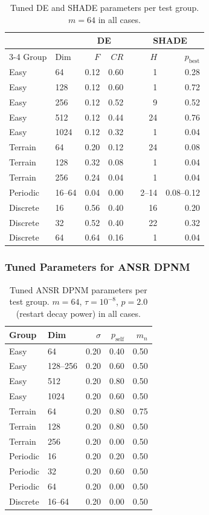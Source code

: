 \documentclass[11pt,a4paper]{article}
\begin{document}
\begin{table}[H]
\centering
\caption{Tuned DE and SHADE parameters per test group. $m = 64$ in all cases.}
\label{tab:params_de}
\begin{tabular}{@{}llrrlrr@{}}
\toprule
 & & \multicolumn{2}{c}{DE} & & \multicolumn{2}{c}{SHADE} \\
\cmidrule{3-4} \cmidrule{6-7}
Group & Dim & $F$ & $CR$ & & $H$ & $p_{\text{best}}$ \\
\midrule
Easy & 64 & 0.12 & 0.60 & & 1 & 0.28 \\
Easy & 128 & 0.12 & 0.60 & & 1 & 0.72 \\
Easy & 256 & 0.12 & 0.52 & & 9 & 0.52 \\
Easy & 512 & 0.12 & 0.44 & & 24 & 0.76 \\
Easy & 1024 & 0.12 & 0.32 & & 1 & 0.04 \\
\midrule
Terrain & 64 & 0.20 & 0.12 & & 24 & 0.08 \\
Terrain & 128 & 0.32 & 0.08 & & 1 & 0.04 \\
Terrain & 256 & 0.24 & 0.04 & & 1 & 0.04 \\
\midrule
Periodic & 16--64 & 0.04 & 0.00 & & 2--14 & 0.08--0.12 \\
\midrule
Discrete & 16 & 0.56 & 0.40 & & 16 & 0.20 \\
Discrete & 32 & 0.52 & 0.40 & & 22 & 0.32 \\
Discrete & 64 & 0.64 & 0.16 & & 1 & 0.04 \\
\bottomrule
\end{tabular}
\end{table}

\subsubsection{Tuned Parameters for ANSR DPNM}

\begin{table}[H]
\centering
\caption{Tuned ANSR DPNM parameters per test group. $m = 64$, $\tau = 10^{-8}$, $p = 2.0$ (restart decay power) in all cases.}
\label{tab:params_dpnm}
\begin{tabular}{@{}llrrr@{}}
\toprule
Group & Dim & $\sigma$ & $p_{\text{self}}$ & $m_n$ \\
\midrule
Easy & 64   & 0.20 & 0.40 & 0.50 \\
Easy & 128--256 & 0.20 & 0.60 & 0.50 \\
Easy & 512  & 0.20 & 0.80 & 0.50 \\
Easy & 1024 & 0.20 & 0.60 & 0.50 \\
\midrule
Terrain & 64  & 0.20 & 0.80 & 0.75 \\
Terrain & 128 & 0.20 & 0.80 & 0.50 \\
Terrain & 256 & 0.20 & 0.00 & 0.50 \\
\midrule
Periodic & 16 & 0.20 & 0.20 & 0.50 \\
Periodic & 32 & 0.20 & 0.60 & 0.50 \\
Periodic & 64 & 0.20 & 0.00 & 0.50 \\
\midrule
Discrete & 16--64 & 0.20 & 0.00 & 0.50 \\
\bottomrule
\end{tabular}
\end{table}
\end{document}
